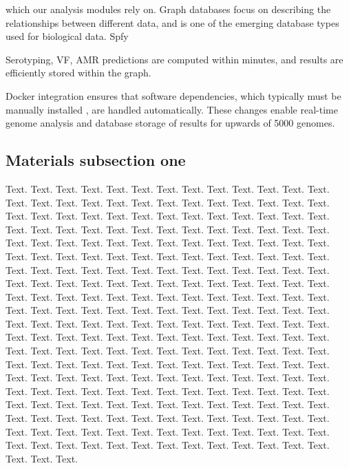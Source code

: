 \documentclass[a4,center,fleqn]{NAR}
\begin{document}
which our analysis modules rely on.
Graph databases focus on describing the relationships between different data, and is one of the emerging \cite{de2015trends} database types used for biological data.
Spfy 


Serotyping, VF, AMR predictions are computed within minutes, and results are efficiently stored within the graph.


Docker integration ensures that software dependencies, which typically must be manually installed \cite{doi:10.1093/bioinformatics/btu153,laing2010pan,inouye2014srst2}, are handled automatically.
These changes enable real-time genome analysis and database storage of results for upwards of 5000 genomes.

\subsection{Materials subsection one}

Text. Text. Text. Text. Text. Text. Text. Text. Text. Text. Text.
Text. Text. Text. Text. Text. Text. Text. Text. Text. Text. Text.
Text. Text. Text. Text. Text. Text. Text. Text. Text. Text. Text.
Text. Text. Text. Text. Text. Text. Text. Text. Text. Text. Text.
Text. Text. Text. Text. Text. Text. Text. Text. Text. Text. Text.
Text. Text. Text. Text. Text. Text. Text. Text. Text. Text. Text.
Text. Text. Text. Text. Text. Text. Text. Text. Text. Text. Text.
Text. Text. Text. Text. Text. Text. Text. Text. Text. Text. Text.
Text. Text. Text. Text. Text. Text. Text. Text. Text. Text. Text.
Text. Text. Text. Text. Text. Text. Text. Text. Text. Text. Text.
Text. Text. Text. Text. Text. Text. Text. Text. Text. Text. Text.
Text. Text. Text. Text. Text. Text. Text. Text. Text. Text. Text.
Text. Text. Text. Text. Text. Text. Text. Text. Text. Text. Text.
Text. Text. Text. Text. Text. Text. Text. Text. Text. Text. Text.
Text. Text. Text. Text. Text. Text. Text. Text. Text. Text. Text.
Text. Text. Text. Text. Text. Text. Text. Text. Text. Text. Text.
Text. Text. Text. Text. Text. Text. Text. Text. Text. Text. Text.
Text. Text. Text. Text. Text. Text. Text. Text. Text. Text. Text.
Text. Text. Text. Text. Text. Text. Text. Text. Text. Text. Text.
Text. Text. Text. Text. Text. Text. Text. Text. Text. Text. Text.
Text. Text. Text. Text. Text. Text. Text. Text. Text. Text. Text.
Text. Text. Text. Text. Text. Text. Text. Text. Text. Text. Text.
Text. Text. Text. Text. Text. Text. Text. Text. Text. Text. Text.
Text. Text. Text. Text. Text. Text. Text. Text. Text. Text.
\end{document}
